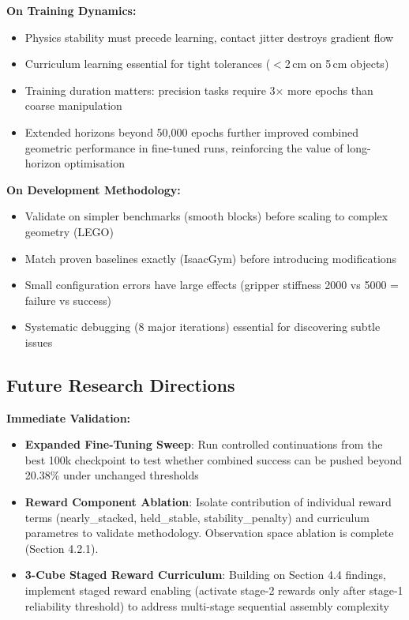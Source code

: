 \documentclass[12pt,a4paper,oneside]{report}
\begin{document}
\textbf{On Training Dynamics:}
\begin{itemize}
    \item Physics stability must precede learning, contact jitter destroys gradient flow
    \item Curriculum learning essential for tight tolerances ($<$2\,cm on 5\,cm objects)
    \item Training duration matters: precision tasks require 3$\times$ more epochs than coarse manipulation
    \item Extended horizons beyond 50{,}000 epochs further improved combined geometric performance in fine-tuned runs, reinforcing the value of long-horizon optimisation
\end{itemize}

\textbf{On Development Methodology:}
\begin{itemize}
    \item Validate on simpler benchmarks (smooth blocks) before scaling to complex geometry (LEGO)
    \item Match proven baselines exactly (IsaacGym) before introducing modifications
    \item Small configuration errors have large effects (gripper stiffness 2000 vs 5000 = failure vs success)
    \item Systematic debugging (8 major iterations) essential for discovering subtle issues
\end{itemize}

\subsection{Future Research Directions}
\label{sec:future_work}

\textbf{Immediate Validation:}
\begin{itemize}
    \item \textbf{Expanded Fine-Tuning Sweep}: Run controlled continuations from the best 100k checkpoint to test whether combined success can be pushed beyond 20.38\% under unchanged thresholds
    \item \textbf{Reward Component Ablation}: Isolate contribution of individual reward terms (nearly\_stacked, held\_stable, stability\_penalty) and curriculum parametres to validate methodology. Observation space ablation is complete (Section 4.2.1).
    \item \textbf{3-Cube Staged Reward Curriculum}: Building on Section 4.4 findings, implement staged reward enabling (activate stage-2 rewards only after stage-1 reliability threshold) to address multi-stage sequential assembly complexity
\end{itemize}
\end{document}
